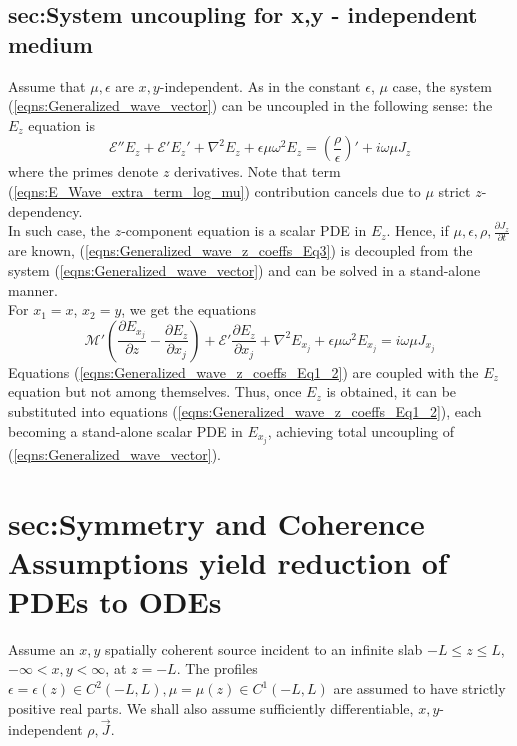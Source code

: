 \documentclass[twocolumn,secnumarabic,amssymb, nobibnotes, aps, prd]{revtex4-1}
\begin{document}
\subsection{sec:System uncoupling for x,y - independent medium}
Assume that $\mu, \epsilon$ are $x,y$-independent. As in the constant $\epsilon$, $\mu$ case, the system (\ref{eqns:Generalized_wave_vector}) can be uncoupled in the following sense: the $E_z$  equation is
\begin{equation}
\mathcal{E}''{E_z} +\mathcal{E}' E_z' + \nabla^2 {E_z} +\epsilon  \mu \omega^2 E_z = \left( \frac{\rho}{\epsilon}\right)' + i \omega \mu J_z
\label{eqns:Generalized_wave_z_coeffs_Eq3}
\end{equation}
where the primes denote $z$ derivatives. Note that term (\ref{eqns:E_Wave_extra_term_log_mu}) contribution cancels due to $\mu$ strict $z$-dependency. \\ In such case, the $z$-component equation is a scalar PDE in $E_z$. Hence, if $\mu, \epsilon,\rho,\frac{\partial J_z}{\partial t}$ are known, (\ref{eqns:Generalized_wave_z_coeffs_Eq3}) is decoupled from the system (\ref{eqns:Generalized_wave_vector}) and can be solved in a stand-alone manner.\\ 
For $x_1=x$, $x_2=y$, we get the  equations  
\begin{equation}
\mathcal{M}'\left( \frac{\partial E_{x_j}}{\partial z} - \frac{\partial E_z}{\partial {x_j}}\right)+\mathcal{E}'\frac{\partial E_z}{\partial {x_j}}+\nabla^2 E_{x_j} +\epsilon \mu \omega^2 E_{x_j} = i \omega \mu J_{x_j}
\label{eqns:Generalized_wave_z_coeffs_Eq1_2}
\end{equation}
Equations (\ref{eqns:Generalized_wave_z_coeffs_Eq1_2}) are coupled with the $E_z$ equation but not among themselves. Thus, once $E_z$ is obtained, it can be substituted into equations  (\ref{eqns:Generalized_wave_z_coeffs_Eq1_2}), each becoming a stand-alone scalar PDE in $E_{x_j}$, achieving total uncoupling of (\ref{eqns:Generalized_wave_vector}).

\section{sec:Symmetry and Coherence Assumptions yield reduction of PDEs to ODEs}

Assume an $x,y$ spatially coherent source incident to an infinite slab $-L \leq z \leq L$, $-\infty <x,y<\infty$, at $z=-L$. The profiles $\epsilon = \epsilon(z) \in C^{2}(-L,L), \mu=\mu(z)\in C^1(-L,L)$ are assumed to have strictly positive real parts. We shall also assume sufficiently differentiable, $x,y$-independent $\rho, \overrightarrow{J}$.\\
\end{document}
